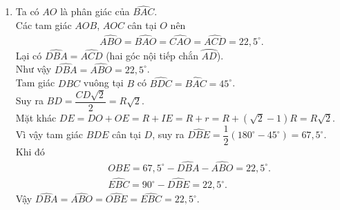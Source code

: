 \begin{ex}
{\begin{enumerate}
   Từ \eqref{1820.5}, \eqref{1820.6} suy ra $A$, $O$, $I$ thẳng hàng.\\
   Tam giác $OIE$ vuông tại $E$ có $\widehat{IOE}=\dfrac{1}{2}\widehat{BOE}=45^\circ$.\\
   Suy ra $r=IE=OI\cdot\dfrac{\sqrt{2}}{2}$.\hfill (\theequation)\label{1820.7}\\
   Vì $(I)$ tiếp xúc trong với $(O)$ nên $OI=R-r$.\hfill (\theequation)\label{1820.8}\\
   Từ \eqref{1820.7}, \eqref{1820.8} suy ra
   \begin{eqnarray*}
    r=(R-r)\cdot\dfrac{\sqrt{2}}{2} \Leftrightarrow (2+\sqrt{2})r=R\sqrt{2} \Leftrightarrow r=\dfrac{R\sqrt{2}}{2+\sqrt{2}} \Leftrightarrow r=\left(\sqrt{2}-1\right)R.
   \end{eqnarray*}
   \item Ta có $AO$ là phân giác của $\widehat{BAC}$.\\
   Các tam giác $AOB$, $AOC$ cân tại $O$ nên
   \begin{eqnarray*}
    \widehat{ABO}=\widehat{BAO}=\widehat{CAO}=\widehat{ACD}=22{,}5^\circ.
   \end{eqnarray*}
   Lại có $\widehat{DBA}=\widehat{ACD}$ (hai góc nội tiếp chắn $\wideparen{AD}$).\\
   Như vậy $\widehat{DBA}=\widehat{ABO}=22{,}5^\circ$.\\
   Tam giác $DBC$ vuông tại $B$ có $\widehat{BDC}=\widehat{BAC}=45^\circ$.\\
   Suy ra $BD=\dfrac{CD\sqrt{2}}{2} = R\sqrt{2}$.\\
   Mặt khác $DE=DO+OE=R+IE=R+r=R+\left(\sqrt{2}-1\right)R=R\sqrt{2}$.\\
   Vì vậy tam giác $BDE$ cân tại $D$, suy ra $\widehat{DBE}=\dfrac{1}{2}\left(180^\circ-45^\circ\right) = 67{,}5^\circ$.\\
   Khi đó
   \begin{eqnarray*}
    && \widehat{OBE}=67{,}5^\circ-\widehat{DBA}-\widehat{ABO}=22{,}5^\circ.\\
    && \widehat{EBC}=90^\circ-\widehat{DBE}=22{,}5^\circ.
   \end{eqnarray*}
   Vậy $\widehat{DBA}=\widehat{ABO}=\widehat{OBE}=\widehat{EBC}=22{,}5^\circ$.
  \end{enumerate}
  }
\end{ex}

